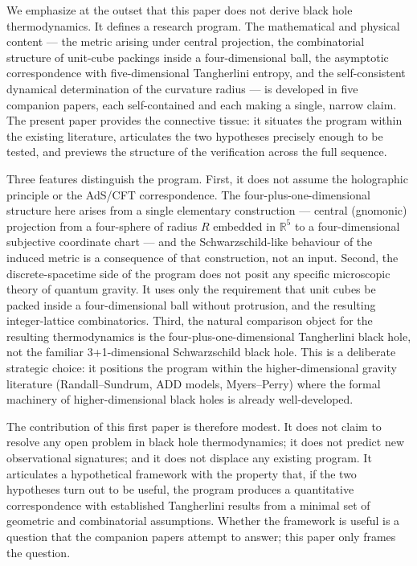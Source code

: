 \documentclass[a4paper,11pt]{article}
\theoremstyle{definition}
\begin{document}
We emphasize at the outset that this paper does not derive black hole
thermodynamics. It defines a research program. The mathematical and
physical content --- the metric arising under central projection, the
combinatorial structure of unit-cube packings inside a four-dimensional
ball, the asymptotic correspondence with five-dimensional Tangherlini
entropy, and the self-consistent dynamical determination of the
curvature radius --- is developed in five companion papers, each
self-contained and each making a single, narrow claim. The present paper
provides the connective tissue: it situates the program within the
existing literature, articulates the two hypotheses precisely enough to
be tested, and previews the structure of the verification across the
full sequence.

Three features distinguish the program. First, it does not assume the
holographic principle or the AdS/CFT correspondence. The
four-plus-one-dimensional structure here arises from a single elementary
construction --- central (gnomonic) projection from a four-sphere of
radius \(R\) embedded in \(\mathbb{R}^5\) to a four-dimensional
subjective coordinate chart --- and the Schwarzschild-like behaviour of
the induced metric is a consequence of that construction, not an input.
Second, the discrete-spacetime side of the program does not posit any
specific microscopic theory of quantum gravity. It uses only the
requirement that unit cubes be packed inside a four-dimensional ball
without protrusion, and the resulting integer-lattice combinatorics.
Third, the natural comparison object for the resulting thermodynamics is
the four-plus-one-dimensional Tangherlini black hole, not the familiar
3+1-dimensional Schwarzschild black hole. This is a deliberate strategic
choice: it positions the program within the higher-dimensional gravity
literature (Randall--Sundrum, ADD models, Myers--Perry) where the formal
machinery of higher-dimensional black holes is already well-developed.

The contribution of this first paper is therefore modest. It does not
claim to resolve any open problem in black hole thermodynamics; it does
not predict new observational signatures; and it does not displace any
existing program. It articulates a hypothetical framework with the
property that, if the two hypotheses turn out to be useful, the program
produces a quantitative correspondence with established Tangherlini
results from a minimal set of geometric and combinatorial assumptions.
Whether the framework is useful is a question that the companion papers
attempt to answer; this paper only frames the question.
\end{document}
